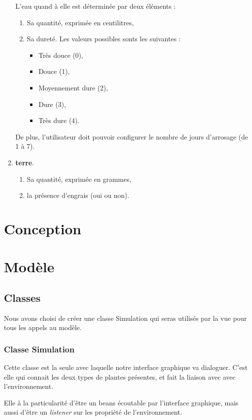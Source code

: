 \documentclass[a4paper,10pt]{article}
\begin{document}
\begin{enumerate}
L'eau quand à elle est déterminée par deux éléments :
\begin{enumerate}
	\item Sa quantité, exprimée en centilitres,
	\item Sa dureté. Les valeurs possibles sonts les suivantes :
		\begin{itemize}
			\item Très douce (0),
			\item Douce (1),
			\item Moyennement dure (2),
			\item Dure (3),
			\item Très dure (4).
		\end{itemize}
	\end{enumerate}
De plus, l'utilisateur doit pouvoir configurer le nombre de jours d'arrosage (de 1 à 7).

 \item \textbf{terre}.
	\begin{enumerate}
	\item Sa quantité, exprimée en grammes,
	\item la présence d'engrais (oui ou non).
	\end{enumerate}
\end{enumerate}


\section{Conception}
\section{Modèle}
\subsection{Classes}
Nous avons choisi de créer une classe Simulation qui seras utilisés par la vue pour tous les appels au modèle.
\subsubsection{Classe Simulation}
Cette classe est la seule avec laquelle notre interface graphique va dialoguer.
C'est elle qui connait les deux types de plantes présentes, et fait la liaison avec avec l'environnement.

Elle à la particularité d'être un beans écoutable par l'interface graphique, mais aussi d'être un \textit{listener} 
sur les propriété de l'environnement.
\end{document}
